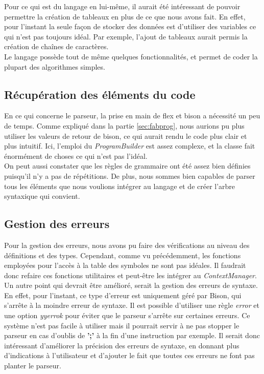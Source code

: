 \documentclass[a4paper]{article}%
\begin{document}
Pour ce qui est du langage en lui-même, il aurait été intéressant de pouvoir
permettre la création de tableaux en plus de ce que nous avons fait. En effet,
pour l'instant la seule façon de stocker des données est d'utiliser des
variables ce qui n'est pas toujours idéal. Par exemple, l'ajout de tableaux
aurait permis la création de chaînes de caractères.\\

Le langage possède tout de même quelques fonctionnalités, et permet de coder la
plupart des algorithmes simples.

\subsection{Récupération des éléments du code}

En ce qui concerne le parseur, la prise en main de flex et bison a nécessité un
peu de temps. Comme expliqué dans la partie \ref{sec:fabprog}, nous aurions pu
plus utiliser les valeurs de retour de bison, ce qui aurait rendu le code plus
clair et plus intuitif. Ici, l'emploi du \textit{ProgramBuilder} est assez
complexe, et la classe fait énormément de choses ce qui n'est pas l'idéal.\\

On peut aussi constater que les règles de grammaire ont été assez bien définies
puisqu'il n'y a pas de répétitions. De plus, nous sommes bien capables de parser
tous les éléments que nous voulions intégrer au langage et de créer l'arbre
syntaxique qui convient.

\subsection{Gestion des erreurs}

Pour la gestion des erreurs, nous avons pu faire des vérifications au niveau des
définitions et des types. Cependant, comme vu précédemment, les fonctions
employées pour l'accès à la table des symboles ne sont pas idéales. Il faudrait
donc refaire ces fonctions utilitaires et peut-être les intégrer au
\textit{ContextManager}.\\

Un autre point qui devrait être amélioré, serait la gestion des erreurs de
syntaxe. En effet, pour l'instant, ce type d'erreur est uniquement géré par
Bison, qui s'arrête à la moindre erreur de syntaxe. Il est possible d'utiliser
une règle \textit{error} et une option \textit{yyerrok} pour éviter que le
parseur s'arrête sur certaines erreurs. Ce système n'est pas facile à utiliser
mais il pourrait servir à ne pas stopper le parseur en cas d'oublis de
\textbf{';'} à la fin d'une instruction par exemple. Il serait donc intéressant
d'améliorer la précision des erreurs de syntaxe, en donnant plus d'indications à
l'utilisateur et d'ajouter le fait que toutes ces erreurs ne font pas planter le
parseur.\\
\end{document}
